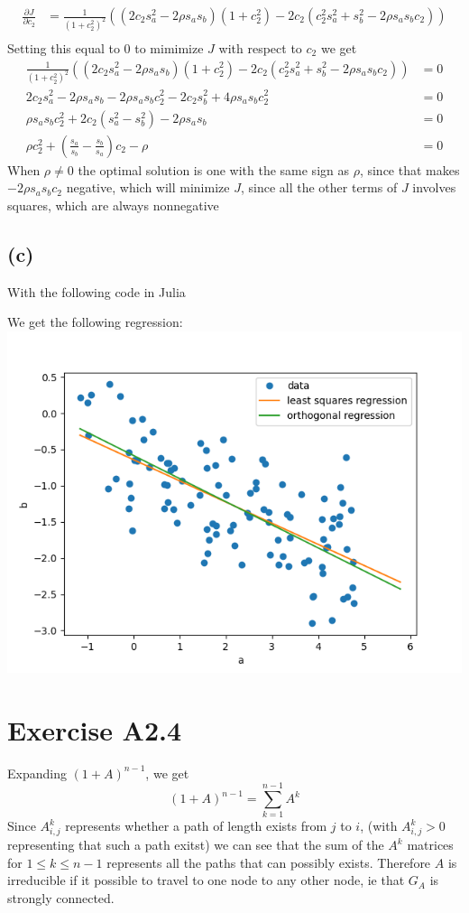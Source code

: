 \begin{align*}
	\frac{\partial J}{\partial c_2}&=\frac{1}{(1+c_2^2)^2}\left((2c_2s_a^2-2\rho s_a s_b)(1+c_2^2)-2c_2(c_2^2s_a^2+s_b^2-2\rho s_a s_b c_2)\right)\\
\end{align*}
Setting this equal to 0 to mimimize $J$ with respect to $c_2$ we get
\begin{align*}
	\frac{1}{(1+c_2^2)^2}\left((2c_2s_a^2-2\rho s_a s_b)(1+c_2^2)-2c_2(c_2^2s_a^2+s_b^2-2\rho s_a s_b c_2)\right)&=0\\
	2c_2s_a^2-2\rho s_a s_b -2\rho s_a s_b c_2^2-2c_2s_b^2+4\rho s_as_b c_2^2&=0\\
	\rho s_as_bc_2^2+2c_2(s_a^2-s_b^2)-2\rho s_a s_b &=0\\
	\rho c_2^2+\left(\frac{s_a}{s_b}-\frac{s_b}{s_a}\right)c_2-\rho &=0
\end{align*}
When $\rho\neq0$ the optimal solution is one with the same sign as 
$\rho$, since that makes $-2\rho s_a s_b c_2$ negative, which will minimize $J$, since all the other terms of $J$ involves squares, which are always nonnegative
\subsection*{(c)}
With the following code in Julia 

We get the following regression:\\
\includegraphics[scale=0.5]{test.png}
\section*{Exercise A2.4}
Expanding $(1+A)^{n-1}$, we get
$$
(1+A)^{n-1}=\sum_{k=1}^{n-1}A^k$$
Since $A^k_{i,j}$ represents whether a path of length exists from $j$ to $i$, (with $A^k_{i,j}>0$ representing that such a path exitst)
we can see that the sum of the $A^k$ matrices for $1\leq k \leq n-1$ represents all the paths that can possibly exists. Therefore $A$ is
irreducible if it possible to travel to one node to any other node, ie that $G_A$ is strongly connected.

